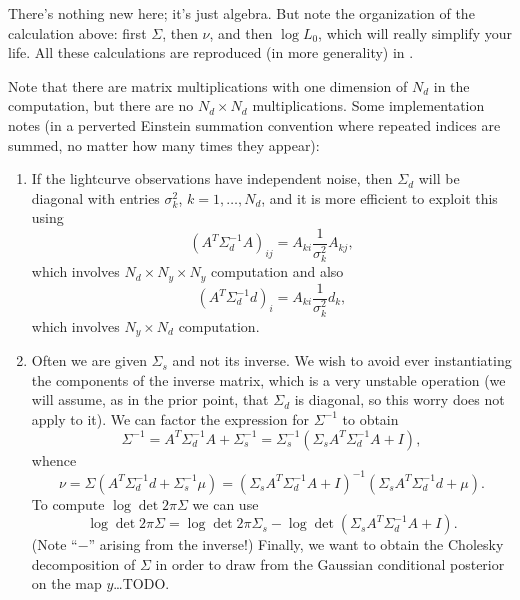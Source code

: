 \documentclass[modern]{aastex631}
\begin{document}
There's nothing new here; it's just algebra.  But note the organization of the
calculation above: first $\Sigma$, then $\nu$, and then $\log L_0$, which will
really simplify your life.  All these calculations are reproduced (in more
generality) in \citet{Hogg2020}.

Note that there are matrix multiplications with one dimension of $N_d$ in the
computation, but there are no $N_d \times N_d$ multiplications.  Some
implementation notes (in a perverted Einstein summation convention where
repeated indices are summed, no matter how many times they appear):
\begin{enumerate}
    \item If the lightcurve observations have independent noise, then $\Sigma_d$
    will be diagonal with entries $\sigma_k^2$, $k = 1, \ldots, N_d$, and it is
    more efficient to exploit this using 
    \begin{equation}
        \left( A^T \Sigma_d^{-1} A \right)_{ij} = A_{ki} \frac{1}{\sigma_k^2} A_{kj},
    \end{equation}
    which involves $N_d \times N_y \times N_y$ computation and also 
    \begin{equation}
        (A^T \Sigma_d^{-1} d)_i = A_{ki} \frac{1}{\sigma_k^2} d_k,
    \end{equation} 
    which involves $N_y \times N_d$ computation.
    \item Often we are given $\Sigma_s$ and not its inverse.  We wish to avoid
    ever instantiating the components of the inverse matrix, which is a very
    unstable operation (we will assume, as in the prior point, that $\Sigma_d$
    is diagonal, so this worry does not apply to it).  We
    can factor the expression for $\Sigma^{-1}$ to obtain 
    \begin{equation}
        \Sigma^{-1} = A^T \Sigma_d^{-1} A + \Sigma_s^{-1} = \Sigma_s^{-1} \left( \Sigma_s A^T \Sigma_d^{-1} A + I \right),
    \end{equation}
    whence 
    \begin{equation}
        \nu = \Sigma \left( A^T \Sigma_d^{-1} d + \Sigma_s^{-1} \mu \right) = \left( \Sigma_s A^T \Sigma_d^{-1} A + I \right)^{-1} \left( \Sigma_s A^T \Sigma_d^{-1} d + \mu \right).
    \end{equation}
    To compute $\log \det 2 \pi \Sigma$ we can use 
    \begin{equation}
        \log \det 2 \pi \Sigma = \log \det 2 \pi \Sigma_s - \log \det \left( \Sigma_s A^T \Sigma_d^{-1} A + I \right).
    \end{equation}
    (Note ``$-$'' arising from the inverse!)  Finally, we want to obtain the
    Cholesky decomposition of $\Sigma$ in order to draw from the Gaussian
    conditional posterior on the map $y$\ldots TODO.
\end{enumerate}



\end{document}
